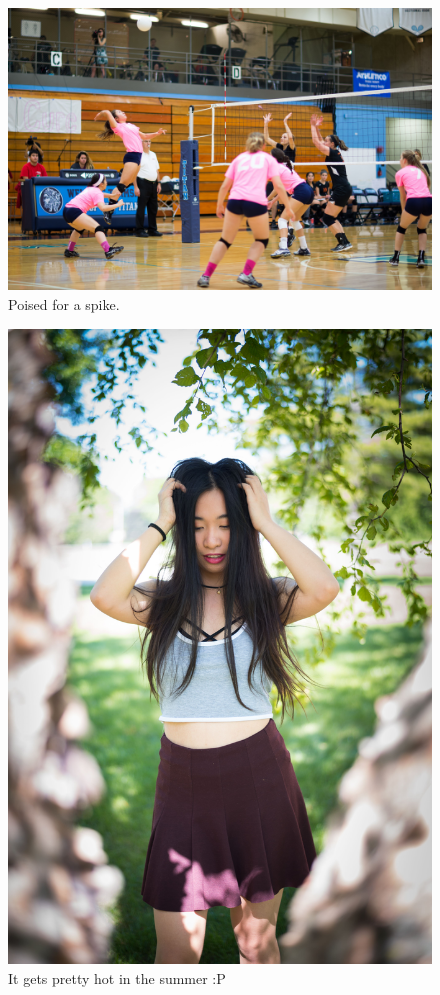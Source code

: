 \documentclass{report}
\begin{document}
\begin{figure}
  \includegraphics[width=\linewidth]{res/sport_volleyball.jpg}
  \caption{Poised for a spike.}
\end{figure}

\begin{figure}
  \includegraphics[width=\linewidth]{res/port_felicia.jpg}
  \caption{It gets pretty hot in the summer :P}
\end{figure}
\end{document}
